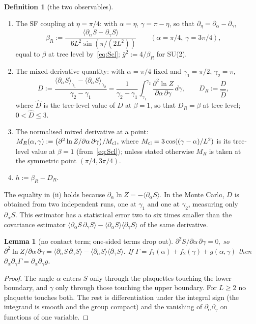 \documentclass[11pt,a4paper]{article}
\newtheorem{lemma}[theorem]{Lemma}
\theoremstyle{definition}
\newtheorem{definition}[theorem]{Definition}
\theoremstyle{remark}
\newcommand{\gb}{\bar g^{2}}
\newcommand{\bR}{\beta_R}
\newcommand{\DR}{D_R}
\begin{document}
\begin{definition}[the two observables]\label{def:obs}
\begin{enumerate}[label=(\roman*),leftmargin=2em]
\item The SF coupling at $\eta=\pi/4$: with $\alpha=\eta$, $\gamma=\pi-\eta$, so that $\partial_\eta=\partial_\alpha-\partial_\gamma$,
\[
\bR:=\frac{\langle\partial_\alpha S-\partial_\gamma S\rangle}{-6L^2\sin(\pi/(2L^2))}\qquad(\alpha=\pi/4,\ \gamma=3\pi/4),
\]
equal to $\beta$ at tree level by~\eqref{eq:Scl}; $\gb:=4/\bR$ for SU(2).
\item The mixed-derivative quantity: with $\alpha=\pi/4$ fixed and $\gamma_1=\pi/2$, $\gamma_2=\pi$,
\[
D:=\frac{\langle\partial_\alpha S\rangle_{\gamma_1}-\langle\partial_\alpha S\rangle_{\gamma_2}}{\gamma_2-\gamma_1}
=\frac{1}{\gamma_2-\gamma_1}\int_{\gamma_1}^{\gamma_2}\frac{\partial^2\ln Z}{\partial\alpha\,\partial\gamma}\,d\gamma ,
\qquad \DR:=\frac{D}{\hat D},
\]
where $\hat D$ is the tree-level value of $D$ at $\beta=1$, so that $\DR=\beta$ at tree level; $0<\hat D\le3$.
\item The normalised mixed derivative at a point: $M_R(\alpha,\gamma):=\bigl(\partial^2\ln Z/\partial\alpha\,\partial\gamma\bigr)/M_{\rm cl}$, where $M_{\rm cl}=3\cos((\gamma-\alpha)/L^2)$ is its tree-level value at $\beta=1$ (from~\eqref{eq:Scl}); unless stated otherwise $M_R$ is taken at the symmetric point $(\pi/4,3\pi/4)$.
\item $h:=\bR-\DR$.
\end{enumerate}
\end{definition}

The equality in (ii) holds because $\partial_\alpha\ln Z=-\langle\partial_\alpha S\rangle$. In the Monte Carlo, $D$ is obtained from two independent runs, one at $\gamma_1$ and one at $\gamma_2$, measuring only $\partial_\alpha S$. This estimator has a statistical error two to six times smaller than the covariance estimator $\langle\partial_\alpha S\,\partial_\gamma S\rangle-\langle\partial_\alpha S\rangle\langle\partial_\gamma S\rangle$ of the same derivative.

\begin{lemma}[no contact term; one-sided terms drop out]\label{lem:mixed}
$\partial^2 S/\partial\alpha\,\partial\gamma=0$, so $\partial^2\ln Z/\partial\alpha\,\partial\gamma=\langle\partial_\alpha S\,\partial_\gamma S\rangle-\langle\partial_\alpha S\rangle\langle\partial_\gamma S\rangle$. If $\Gamma=f_1(\alpha)+f_2(\gamma)+g(\alpha,\gamma)$ then $\partial_\alpha\partial_\gamma\Gamma=\partial_\alpha\partial_\gamma g$.
\end{lemma}
\begin{proof}
The angle $\alpha$ enters $S$ only through the plaquettes touching the lower boundary, and $\gamma$ only through those touching the upper boundary. For $L\ge2$ no plaquette touches both. The rest is differentiation under the integral sign (the integrand is smooth and the group compact) and the vanishing of $\partial_\alpha\partial_\gamma$ on functions of one variable.
\end{proof}
\end{document}
